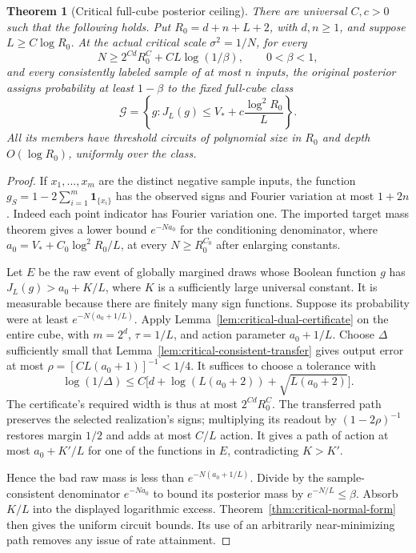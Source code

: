 \documentclass[11pt]{article}
\newtheorem{theorem}{Theorem}[section]
\theoremstyle{remark}
\begin{document}
\begin{theorem}[Critical full-cube posterior ceiling]
\label{thm:critical-ceiling}
There are universal $C,c>0$ such that the following holds. Put
$R_0=d+n+L+2$, with $d,n\ge1$, and suppose
$L\ge C\log R_0$. At the actual critical scale $\sigma^2=1/N$,
for every
\[
 N\ge 2^{Cd}R_0^C+CL\log(1/\beta),\qquad0<\beta<1,
\]
and every consistently labeled sample of at most $n$ inputs, the
original posterior assigns probability at least $1-\beta$ to the
fixed full-cube class
\[
 \mathcal G=\left\{g:J_L(g)\le
             V_*+c\frac{\log^2R_0}{L}\right\}.
\]
All its members have threshold circuits of polynomial size in
$R_0$ and depth $O(\log R_0)$, uniformly over the class.
\end{theorem}
\begin{proof}
If $x_1,\ldots,x_m$ are the distinct negative sample inputs, the
function $g_S=1-2\sum_{i=1}^m\boldsymbol1_{\{x_i\}}$ has the
observed signs and Fourier variation at most $1+2n$. Indeed each
point indicator has Fourier variation one. The imported target
mass theorem gives a lower bound $e^{-Na_0}$ for the conditioning
denominator, where
$a_0=V_*+C_0\log^2R_0/L$, at every $N\ge R_0^{C_0}$ after
enlarging constants.

Let $E$ be the raw event of globally margined draws whose Boolean
function $g$ has $J_L(g)>a_0+K/L$, where $K$ is a sufficiently
large universal constant. It is measurable because there are
finitely many sign functions. Suppose its probability were at
least $e^{-N(a_0+1/L)}$. Apply
Lemma~\ref{lem:critical-dual-certificate} on the entire cube, with
$m=2^d$, $\tau=1/L$, and action parameter $a_0+1/L$.
Choose $\Delta$ sufficiently small that
Lemma~\ref{lem:critical-consistent-transfer} gives output error
at most $\rho=[C L(a_0+1)]^{-1}<1/4$.
It suffices to choose a tolerance with
\[
 \log(1/\Delta)
 \le C\bigl[d+\log(L(a_0+2))+\sqrt{L(a_0+2)}\bigr].
\]
The certificate's required width is thus at most
$2^{Cd}R_0^C$. The transferred path preserves the selected
realization's signs; multiplying its readout by $(1-2\rho)^{-1}$
restores margin $1/2$ and adds at most $C/L$ action. It gives a
path of action at most $a_0+K'/L$ for one of the functions in $E$,
contradicting $K>K'$.

Hence the bad raw mass is less than $e^{-N(a_0+1/L)}$.
Divide by the sample-consistent denominator $e^{-Na_0}$ to bound
its posterior mass by $e^{-N/L}\le\beta$. Absorb $K/L$ into the
displayed logarithmic excess. Theorem~\ref{thm:critical-normal-form}
then gives the uniform circuit bounds. Its use of an arbitrarily
near-minimizing path removes any issue of rate attainment.
\end{proof}
\end{document}
